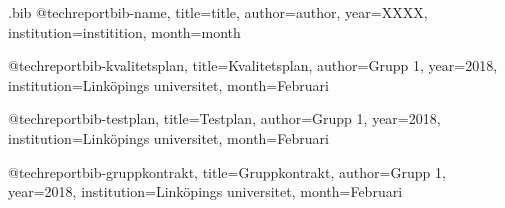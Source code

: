 \begin{filecontents*}{\jobname.bib}
@techreport{bib-name,
    title={title},
    author={author},
    year={XXXX},
    institution={institition},
    month={month}
}

@techreport{bib-kvalitetsplan,
    title={Kvalitetsplan},
    author={Grupp 1},
    year={2018},
    institution={Linköpings universitet},
    month={Februari}
}


@techreport{bib-testplan,
    title={Testplan},
    author={Grupp 1},
    year={2018},
    institution={Linköpings universitet},
    month={Februari}
}


@techreport{bib-gruppkontrakt,
    title={Gruppkontrakt},
    author={Grupp 1},
    year={2018},
    institution={Linköpings universitet},
    month={Februari}
}



\end{filecontents*}
